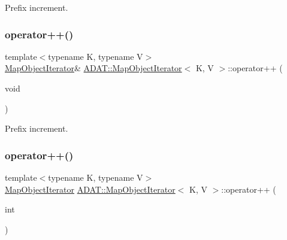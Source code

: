 Prefix increment. 

\mbox{\label{classADAT_1_1MapObjectIterator_a2eedaf3b2fc70d48afd45bd37c5e6e69}} 
\subsubsection{\texorpdfstring{operator++()}{operator++()}\hspace{0.1cm}{\footnotesize\ttfamily [3/6]}}
{\footnotesize\ttfamily template$<$typename K, typename V$>$ \\
\mbox{\hyperlink{classADAT_1_1MapObjectIterator}{Map\+Object\+Iterator}}\& \mbox{\hyperlink{classADAT_1_1MapObjectIterator}{A\+D\+A\+T\+::\+Map\+Object\+Iterator}}$<$ K, V $>$\+::operator++ (\begin{DoxyParamCaption}\item[{void}]{ }\end{DoxyParamCaption})\hspace{0.3cm}{\ttfamily [inline]}}



Prefix increment. 

\mbox{\label{classADAT_1_1MapObjectIterator_a90809a5488988dd0d49ce25df35756ae}} 
\subsubsection{\texorpdfstring{operator++()}{operator++()}\hspace{0.1cm}{\footnotesize\ttfamily [4/6]}}
{\footnotesize\ttfamily template$<$typename K, typename V$>$ \\
\mbox{\hyperlink{classADAT_1_1MapObjectIterator}{Map\+Object\+Iterator}} \mbox{\hyperlink{classADAT_1_1MapObjectIterator}{A\+D\+A\+T\+::\+Map\+Object\+Iterator}}$<$ K, V $>$\+::operator++ (\begin{DoxyParamCaption}\item[{int}]{ }\end{DoxyParamCaption})\hspace{0.3cm}{\ttfamily [inline]}}



